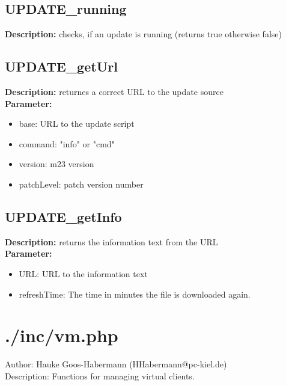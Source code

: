 \subsection{UPDATE\_running}
\textbf{Description:} checks, if an update is running (returns true otherwise false)\\

\subsection{UPDATE\_getUrl}
\textbf{Description:} returnes a correct URL to the update source\\
\textbf{Parameter:}
\begin{itemize}
\item base: URL to the update script
\item command: "info" or "cmd"
\item version: m23 version
\item patchLevel: patch version number
\end{itemize}

\subsection{UPDATE\_getInfo}
\textbf{Description:} returns the information text from the URL\\
\textbf{Parameter:}
\begin{itemize}
\item URL: URL to the information text
\item refreshTime: The time in minutes the file is downloaded again.
\end{itemize}

\newpage\section{./inc/vm.php}
 Author: Hauke Goos-Habermann (HHabermann@pc-kiel.de)\\
 Description: Functions for managing virtual clients.\\

